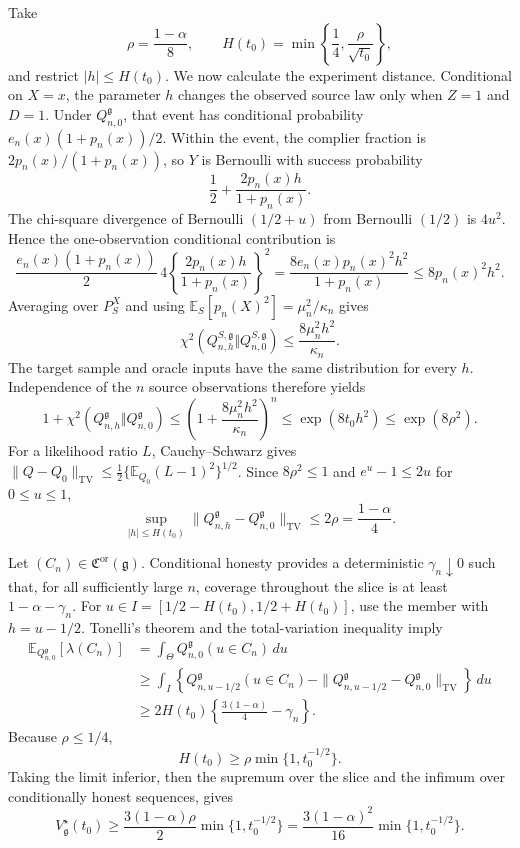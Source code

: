 Take
\[
 \rho=\frac{1-\alpha}{8},
 \qquad H(t_0)=\min\left\{\frac14,\frac{\rho}{\sqrt{t_0}}\right\},
\]
and restrict \(|h|\le H(t_0)\).  We now calculate the experiment distance.  Conditional on \(X=x\), the parameter \(h\) changes the observed source law only when \(Z=1\) and \(D=1\).  Under \(Q_{n,0}^{\mathfrak g}\), that event has conditional probability \(e_n(x)(1+p_n(x))/2\).  Within the event, the complier fraction is \(2p_n(x)/(1+p_n(x))\), so \(Y\) is Bernoulli with success probability
\[
 \frac12+\frac{2p_n(x)h}{1+p_n(x)}.
\]
The chi-square divergence of Bernoulli \((1/2+u)\) from Bernoulli \((1/2)\) is \(4u^2\).  Hence the one-observation conditional contribution is
\[
 \frac{e_n(x)(1+p_n(x))}{2}\,
 4\left\{\frac{2p_n(x)h}{1+p_n(x)}\right\}^2
 =\frac{8e_n(x)p_n(x)^2h^2}{1+p_n(x)}
 \le8p_n(x)^2h^2.
\]
Averaging over \(P_S^X\) and using \(\mathbb E_S[p_n(X)^2]=\mu_n^2/\kappa_n\) gives
\[
 \chi^2(Q_{n,h}^{S,\mathfrak g}\Vert Q_{n,0}^{S,\mathfrak g})
 \le\frac{8\mu_n^2h^2}{\kappa_n}.
\]
The target sample and oracle inputs have the same distribution for every \(h\).  Independence of the \(n\) source observations therefore yields
\[
 1+\chi^2(Q_{n,h}^{\mathfrak g}\Vert Q_{n,0}^{\mathfrak g})
 \le\left(1+\frac{8\mu_n^2h^2}{\kappa_n}\right)^n
 \le\exp(8t_0h^2)
 \le\exp(8\rho^2).
\]
For a likelihood ratio \(L\), Cauchy--Schwarz gives \(\|Q-Q_0\|_{\mathrm{TV}}\le\tfrac12\{\mathbb E_{Q_0}(L-1)^2\}^{1/2}\).  Since \(8\rho^2\le1\) and \(e^u-1\le2u\) for \(0\le u\le1\),
\[
 \sup_{|h|\le H(t_0)}
 \|Q_{n,h}^{\mathfrak g}-Q_{n,0}^{\mathfrak g}\|_{\mathrm{TV}}
 \le2\rho=\frac{1-\alpha}{4}.
\]

Let \((C_n)\in\mathfrak C^{\mathrm{or}}(\mathfrak g)\).  Conditional honesty provides a deterministic \(\gamma_n\downarrow0\) such that, for all sufficiently large \(n\), coverage throughout the slice is at least \(1-\alpha-\gamma_n\).  For \(u\in I=[1/2-H(t_0),1/2+H(t_0)]\), use the member with \(h=u-1/2\).  Tonelli's theorem and the total-variation inequality imply
\[
 \begin{aligned}
 \mathbb E_{Q_{n,0}^{\mathfrak g}}[\lambda(C_n)]
 &=\int_\Theta Q_{n,0}^{\mathfrak g}(u\in C_n)\,du\\
 &\ge\int_I\left\{Q_{n,u-1/2}^{\mathfrak g}(u\in C_n)
 -\|Q_{n,u-1/2}^{\mathfrak g}-Q_{n,0}^{\mathfrak g}\|_{\mathrm{TV}}\right\}\,du\\
 &\ge2H(t_0)\left\{\frac{3(1-\alpha)}4-\gamma_n\right\}.
 \end{aligned}
\]
Because \(\rho\le1/4\),
\[
 H(t_0)\ge\rho\min\{1,t_0^{-1/2}\}.
\]
Taking the limit inferior, then the supremum over the slice and the infimum over conditionally honest sequences, gives
\[
 V_{\mathfrak g}^\star(t_0)
 \ge\frac{3(1-\alpha)\rho}{2}\min\{1,t_0^{-1/2}\}
 =\frac{3(1-\alpha)^2}{16}\min\{1,t_0^{-1/2}\}.
\]

